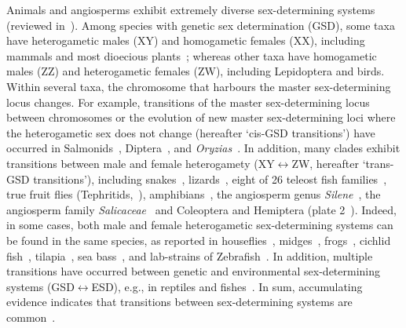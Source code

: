 \documentclass[10pt,letterpaper]{article}
\begin{document}
Animals and angiosperms exhibit extremely diverse sex-determining systems (reviewed in~\cite{Bull:1983vi,Charlesworth:2010it,Beukeboom:2014vb,Bachtrog:2014bx}). 
Among species with genetic sex determination (GSD), some taxa have heterogametic males (XY) and homogametic females (XX), including %
mammals and most dioecious plants~\cite{Ming:2011iy}; whereas other taxa have homogametic males (ZZ) and heterogametic females (ZW), including Lepidoptera and birds. 
Within several taxa, the chromosome that harbours the master sex-determining locus changes. 
For example, transitions of the master sex-determining locus between chromosomes or the evolution of new master sex-determining loci where the heterogametic sex does not change (hereafter `cis-GSD transitions') have occurred in Salmonids~\cite{Li:2011fm,Yano:2012di}, Diptera~\cite{Vicoso:2015hf}, and \textit{Oryzias}~\cite{Myosho:2012fv}. 
In addition, many clades exhibit transitions between male and female heterogamety (XY$\leftrightarrow$ZW, hereafter `trans-GSD transitions'), including snakes~\cite{Gamble2017}, lizards~\cite{Ezaz:2009tk}, eight of 26 teleost fish families~\cite{Mank:2006bt}, true fruit flies (Tephritids,~\cite{Vicoso:2015hf}), amphibians~\cite{Hillis:1990gu}, the angiosperm genus \textit{Silene}~\cite{Slancarova:2013dq}, the angiosperm family \textit{Salicaceae}~\cite{Pucholt2015,Pucholt2017} and Coleoptera and Hemiptera (plate 2~\cite{Beukeboom:2014vb}).
Indeed, in some cases, both male and female heterogametic sex-determining systems can be found in the same species, as reported in houseflies~\cite{Macdonald1978}, midges~\cite{Thompson1971}, frogs~\cite{Ogata:2007jm}, cichlid fish~\cite{Ser:2010iq}, tilapia~\cite{Lee2004}, sea bass~\cite{Vandeputte2007}, and lab-strains of Zebrafish~\cite{Liew2012,Wilson2014}.
In addition, multiple transitions have occurred between genetic and environmental sex-determining systems (GSD$\leftrightarrow$ESD), e.g., in reptiles and fishes~\cite{Conover:1987in,Mank:2006bt,Pokorna:2009ui,Ezaz:2009tk,Pen:2010kk,Holleley:2015hc}.
In sum, accumulating evidence indicates that transitions between sex-determining systems are common~\cite{Bachtrog:2014bx}.
\end{document}
